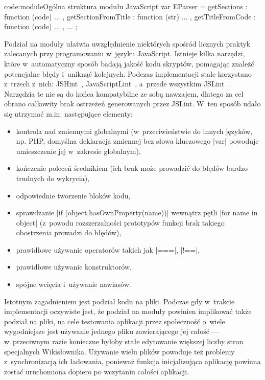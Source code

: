 \begin{jscode}{code:module}{Ogólna struktura modułu JavaScript}
var EParser = {
	getSections : function (code) {
		...
	},
	getSectionFromTitle : function (str) {
		...
	},
	getTitleFromCode : function (code) {
		...
	},
	...
};
\end{jscode}
Podział na moduły ułatwia uwzględnienie niektórych spośród licznych praktyk zalecanych przy programowaniu w~języku JavaScript. Istnieje kilka narzędzi, które w~automatyczny sposób badają jakość kodu skryptów, pomagając znaleźć potencjalne błędy i~uniknąć kolejnych. Podczas implementacji stale korzystano z~trzech z~nich: JSHint~\cite{jshint:doc}, JavaScriptLint~\cite{javascriptlint:doc}, a~przede wszystkim JSLint~\cite{jslint:doc}. Narzędzia te nie są do końca kompatybilne ze sobą nawzajem, dlatego za cel obrano całkowity brak ostrzeżeń generowanych przez JSLint. W~ten sposób udało się utrzymać m.in. następujące elementy:
\begin{itemize}
	\item kontrola nad zmiennymi globalnymi (w~przeciwieństwie do innych języków, np. PHP, domyślna deklaracja zmiennej bez słowa kluczowego \kod|var| powoduje umieszczenie jej w~zakresie globalnym),
	\item kończenie poleceń średnikiem (ich brak może prowadzić do błędów bardzo trudnych do wykrycia),
	\item odpowiednie tworzenie bloków kodu,
	\item sprawdzanie \kod|if (object.hasOwnProperty(name))| wewnątrz pętli \kod|for name in object| (z~powodu rozszerzalności prototypów funkcji brak takiego obostrzenia prowadzi do błędów),
	\item prawidłowe używanie operatorów takich jak \kod|===|, \kod|!==|,
	\item prawidłowe używanie konstruktorów,
	\item spójne wcięcia i~używanie nawiasów.
\end{itemize}

Istotnym zagadnieniem jest podział kodu na pliki. Podczas gdy w~trakcie implementacji oczywiste jest, że podział na moduły powinien implikować także podział na pliki, na cele testowania aplikacji przez społeczność o~wiele wygodniejsze jest używanie jednego pliku zawierającego jej całość --- w~przeciwnym razie konieczne byłoby stałe edytowanie większej liczby stron specjalnych Wikisłownika. Używanie wielu plików powoduje też problemy z~synchronizacją ich ładowania, ponieważ funkcja inicjalizująca aplikację powinna zostać uruchomiona dopiero po wczytaniu całości aplikacji.


